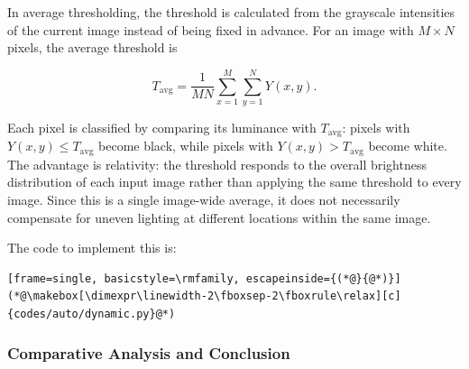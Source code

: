 In average thresholding, the threshold is calculated from the grayscale intensities of the current image instead of being fixed in advance. For an image with $M\times N$ pixels, the average threshold is

\begin{equation}
T_{\mathrm{avg}}=\frac{1}{MN}\sum_{x=1}^{M}\sum_{y=1}^{N}Y(x,y).
\end{equation}

Each pixel is classified by comparing its luminance with $T_{\mathrm{avg}}$: pixels with $Y(x,y)\leq T_{\mathrm{avg}}$ become black, while pixels with $Y(x,y)>T_{\mathrm{avg}}$ become white. The advantage is relativity: the threshold responds to the overall brightness distribution of each input image rather than applying the same threshold to every image. Since this is a single image-wide average, it does not necessarily compensate for uneven lighting at different locations within the same image.

\begin{center}
\hfill
{}\par\vspace{0.6em}
\hfill
{}\par\vspace{0.6em}
\hfill
{}\par\vspace{0.6em}
\hfill
{}
\end{center}

The code to implement this is:
\begin{lstlisting}[frame=single, basicstyle=\rmfamily, escapeinside={(*@}{@*)}]
(*@\makebox[\dimexpr\linewidth-2\fboxsep-2\fboxrule\relax][c]{codes/auto/dynamic.py}@*)
\end{lstlisting}

\subsubsection{Comparative Analysis and Conclusion}
\label{sec:comparison}


